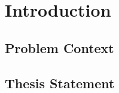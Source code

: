\section{Introduction}\label{sec::introduction}

\subsection{Problem Context}

\subsection{Thesis Statement}

